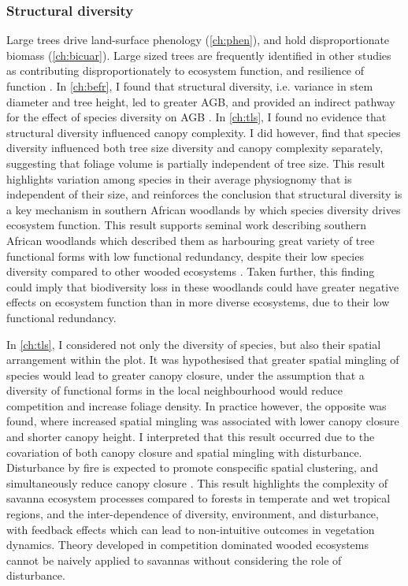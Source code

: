 \begin{refsection}
\subsubsection{Structural diversity}
\label{discussion:sssec:struc}

Large trees drive land-surface phenology (\autoref{ch:phen}), and hold disproportionate biomass (\autoref{ch:bicuar}). Large sized trees are frequently identified in other studies as contributing disproportionately to ecosystem function, and resilience of function \citep{Ali2021}. In \autoref{ch:befr}, I found that structural diversity, i.e. variance in stem diameter and tree height, led to greater AGB, and provided an indirect pathway for the effect of species diversity on AGB \citep{Ali2016, Pedro2017}. In \autoref{ch:tls}, I found no evidence that structural diversity influenced canopy complexity. I did however, find that species diversity influenced both tree size diversity and canopy complexity separately, suggesting that foliage volume is partially independent of tree size. This result highlights variation among species in their average physiognomy that is independent of their size, and reinforces the conclusion that structural diversity is a key mechanism in southern African woodlands by which species diversity drives ecosystem function. This result supports seminal work describing southern African woodlands which described them as harbouring great variety of tree functional forms with low functional redundancy, despite their low species diversity compared to other wooded ecosystems \citep{Solbrig1996}. Taken further, this finding could imply that biodiversity loss in these woodlands could have greater negative effects on ecosystem function than in more diverse ecosystems, due to their low functional redundancy.

In \autoref{ch:tls}, I considered not only the diversity of species, but also their spatial arrangement within the plot. It was hypothesised that greater spatial mingling of species would lead to greater canopy closure, under the assumption that a diversity of functional forms in the local neighbourhood would reduce competition and increase foliage density. In practice however, the opposite was found, where increased spatial mingling was associated with lower canopy closure and shorter canopy height. I interpreted that this result occurred due to the covariation of both canopy closure and spatial mingling with disturbance. Disturbance by fire is expected to promote conspecific spatial clustering, and simultaneously reduce canopy closure \citep{Martens2000}. This result highlights the complexity of savanna ecosystem processes compared to forests in temperate and wet tropical regions, and the inter-dependence of diversity, environment, and disturbance, with feedback effects which can lead to non-intuitive outcomes in vegetation dynamics. Theory developed in competition dominated wooded ecosystems cannot be naively applied to savannas without considering the role of disturbance.


\end{refsection}
